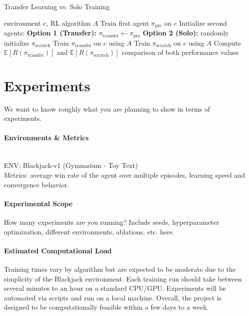\documentclass{article}
\begin{document}
\begin{algorithm}[H]
    \caption{Transfer Learning vs. Solo Training}
    \label{alg:transfer}
    \begin{algorithmic}
        \Require environment $e$, RL algorithm $A$
        \State Train first agent $\pi_{\text{pre}}$ on $e$
        \State Initialize second agents:
        \Statex \quad \textbf{Option 1 (Transfer):} $\pi_{\text{transfer}} \leftarrow \pi_{\text{pre}}$
        \Statex \quad \textbf{Option 2 (Solo):} randomly initialize $\pi_{\text{scratch}}$
            \State Train $\pi_{\text{transfer}}$ on $e$ using $A$
            \State Train $\pi_{\text{scratch}}$ on $e$ using $A$
        \EndWhile
        \State Compute $\mathbb{E}[R(\pi_{\text{transfer}})]$ and $\mathbb{E}[R(\pi_{\text{scratch}})]$
        \State \Return comparison of both performance values
    \end{algorithmic}
\end{algorithm}

\section{Experiments}
We want to know roughly what you are planning to show in terms of experiments. 

\paragraph{Environments \& Metrics}
~\\
ENV: Blackjack-v1 (Gymnasium - Toy Text)\\
Metrics: average win rate of the agent over multiple episodes, learning speed and convergence behavior.

\paragraph{Experimental Scope} How many experiments are you running? Include seeds, hyperparameter optimization, different environments, ablations, etc. here.

\paragraph{Estimated Computational Load}
Training times vary by algorithm but are expected to be moderate due to the simplicity of the Blackjack environment. Each training run should take between several minutes to an hour on a standard CPU/GPU. Experiments will be automated via scripts and run on a local machine. Overall, the project is designed to be computationally feasible within a few days to a week.
\end{document}
